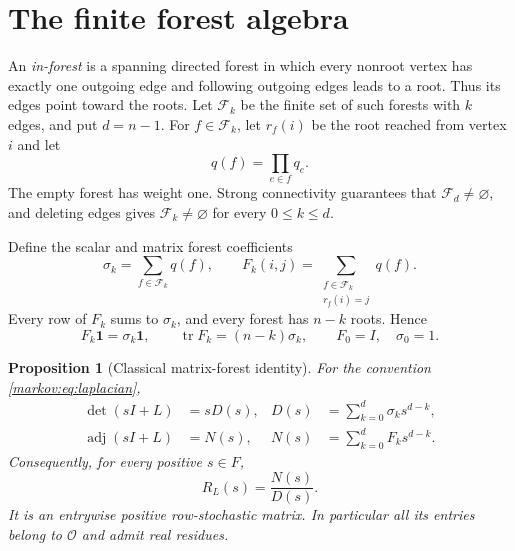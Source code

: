 \documentclass[11pt]{article}
\numberwithin{equation}{section}
\newtheorem{proposition}[theorem]{Proposition}
\theoremstyle{definition}
\theoremstyle{remark}
\newcommand{\F}{\mathcal F}
\newcommand{\Ocal}{\mathcal O}
\newcommand{\one}{\mathbf 1}
\newcommand{\tr}{\operatorname{tr}}
\newcommand{\adj}{\operatorname{adj}}
\begin{document}
\section{The finite forest algebra}\label{markov:sec:forests}

An \emph{in-forest} is a spanning directed forest in which every nonroot vertex
has exactly one outgoing edge and following outgoing edges leads to a root.
Thus its edges point toward the roots. Let $\F_k$ be the finite set of such
forests with $k$ edges, and put $d=n-1$. For $f\in\F_k$, let $r_f(i)$ be the root
reached from vertex $i$ and let
\[
 q(f)=\prod_{e\in f}q_e.
\]
The empty forest has weight one. Strong connectivity guarantees that
$\F_d\ne\varnothing$, and deleting edges gives $\F_k\ne\varnothing$ for every
$0\le k\le d$.

Define the scalar and matrix forest coefficients
\begin{equation}\label{markov:eq:forest-coefficients}
 \sigma_k=\sum_{f\in\F_k}q(f),\qquad
 F_k(i,j)=\sum_{\substack{f\in\F_k\\r_f(i)=j}}q(f).
\end{equation}
Every row of $F_k$ sums to $\sigma_k$, and every forest has $n-k$ roots. Hence
\begin{equation}\label{markov:eq:forest-rows-trace}
 F_k\one=\sigma_k\one,\qquad
 \tr F_k=(n-k)\sigma_k,\qquad F_0=I,\quad\sigma_0=1.
\end{equation}

\begin{proposition}[Classical matrix-forest identity]\label{markov:prop:forest}
For the convention \eqref{markov:eq:laplacian},
\begin{align}
 \det(sI+L)&=sD(s),&D(s)&=\sum_{k=0}^d\sigma_k s^{d-k},\label{markov:eq:forest-det}\\
 \adj(sI+L)&=N(s),&N(s)&=\sum_{k=0}^d F_k s^{d-k}.\label{markov:eq:forest-adj}
\end{align}
Consequently, for every positive $s\in F$,
\begin{equation}\label{markov:eq:forest-resolvent}
 R_L(s)=\frac{N(s)}{D(s)}.
\end{equation}
It is an entrywise positive row-stochastic matrix. In particular all its entries
belong to $\Ocal$ and admit real residues.
\end{proposition}
\end{document}
